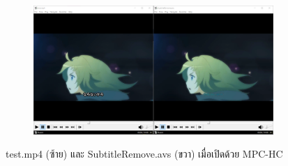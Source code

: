 \begin{figure}[H]
    \centering
    \begin{subfigure}{0.8\linewidth}
        \centering
        \includegraphics[width=1\linewidth]{image/demo_anime/result.png}
    \end{subfigure}
    \caption{test.mp4 (ซ้าย) และ SubtitleRemove.avs (ขวา) เมื่อเปิดด้วย MPC-HC}
\end{figure}